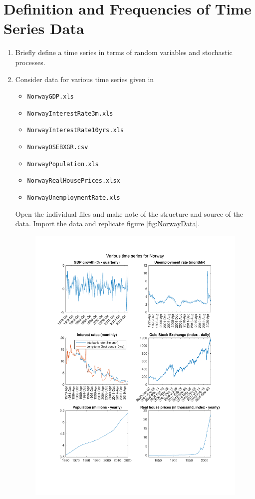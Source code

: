 \section[Definition and Frequencies of Time Series Data]{Definition and Frequencies of Time Series Data\label{ex:DefinitionFrequenciesTimeSeriesData}}

\begin{enumerate}
	\item Briefly define a time series in terms of random variables and stochastic processes.	
	\item Consider data for various time series given in
	\begin{itemize}
		\item \texttt{NorwayGDP.xls}
		\item \texttt{NorwayInterestRate3m.xls} 
		\item \texttt{NorwayInterestRate10yrs.xls}
		\item \texttt{NorwayOSEBXGR.csv}
		\item \texttt{NorwayPopulation.xls}
		\item \texttt{NorwayRealHousePrices.xlsx}
		\item \texttt{NorwayUnemploymentRate.xls}
	\end{itemize}
	Open the individual files and make note of the structure and source of the data.
	Import the data and replicate figure \ref{fig:NorwayData}.
	   \begin{figure}[htbp]
		\centering
		\includegraphics[width=\linewidth]{plots/NorwayDataOverviewMatlab.pdf}

\end{figure}
\end{enumerate}
